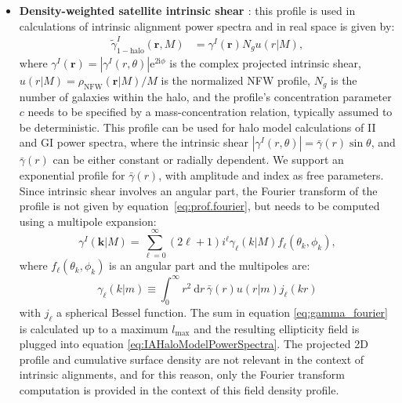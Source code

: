 \documentclass[\docopts]{\docclass}
\begin{document}
\begin{itemize}
  \item{\bf Density-weighted satellite intrinsic shear \citep{SchneiderBridle2010, Fortuna2021}}: this profile is used in calculations of intrinsic alignment power spectra and in real space is given by:
  \begin{align}
  	\tilde{\gamma}_{1-\text{halo}}^{I}(\mathbf{r}, M) &=  \gamma^I(\mathbf{r})N_gu(r|M),
  \end{align}
  where $\gamma^I(\mathbf{r})=\left|\gamma^{I}(r, \theta)\right| \mathrm{e}^{2 \mathrm{i} \phi}$ is the complex projected intrinsic shear, $u(r|M) = \rho_{\text{NFW}}(\mathbf{r}|M)/M$ is the normalized NFW profile, $N_g$ is the number of galaxies within the halo, and the profile's concentration parameter $c$ needs to be specified by a mass-concentration relation, typically assumed to be deterministic. This profile can be used for halo model calculations of II and GI power spectra, where the intrinsic shear $\left|\gamma^{I}(r, \theta)\right|=\bar{\gamma}(r)\sin\theta$, and $\bar{\gamma}(r)$ can be either constant or radially dependent. We support an exponential profile for $\bar{\gamma}(r)$, with amplitude and index as free parameters. Since intrinsic shear involves an angular part, the Fourier transform of the profile is not given by equation~\ref{eq:prof.fourier}, but needs to be computed using a multipole expansion:
  \begin{equation}
  	\gamma^{I}(\mathbf{k}| M)= \sum_{\ell=0}^{\infty}(2 \ell+1) i^{\ell} \gamma_{\ell}\left(k | M\right) f_{\ell}\left(\theta_{k}, \phi_{k}\right),
  	\label{eq:gamma_fourier}
  \end{equation}
  where $f_{\ell}\left(\theta_{k}, \phi_{k}\right)$ is an angular part \cite[Eq. C8]{Fortuna2021} and the multipoles are:
  $$
  \gamma_{\ell}\left(k | m\right) \equiv \int_{0}^{\infty} r^{2} \mathrm{~d} r\, \bar{\gamma}(r)  u(r | m) j_{\ell}(k r)
  $$
  with $j_\ell$ a spherical Bessel function. The sum in equation \ref{eq:gamma_fourier} is calculated up to a maximum $l_\mathrm{max}$ and the resulting ellipticity field is plugged into equation \ref{eq:IAHaloModelPowerSpectra}. The projected 2D profile and cumulative surface density are not relevant in the context of intrinsic alignments, and for this reason, only the Fourier transform computation is provided in the context of this field density profile.\\
\end{itemize}
\end{document}
